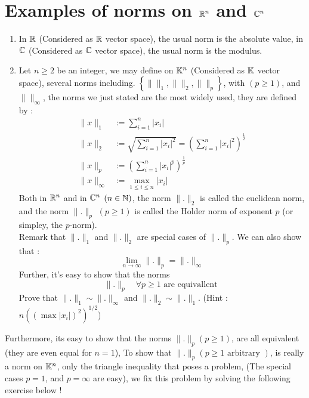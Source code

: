 
% 

\lecday[2025-02-06]

% 
\large


\section{Examples of norms on 
	\texorpdfstring{$\mathbb{R}^n$}{Rn} and 
	\texorpdfstring{$\mathbb{C}^n$}{Cn}}
\begin{example}
	\begin{enumerate}
	\item In $\mathbb{R} $ (Considered as $\mathbb{R} $ vector space), the usual
		norm is the absolute value, in $\mathbb{C} $ (Considered
		as $\mathbb{C} $ vector space), the usual norm is the modulus.
	\item  Let $n \geq 2$ be an integer, we may define 
		on $\mathbb{K}^n$ (Considered as $\mathbb{K}$ vector space), several norms
		including. 
		$\left\{ \|  \| _{1}, \|  \| _{2}, \|  \| _{p} \right\}$, with 
		$\left( p \geq 1 \right)$, and $\|  \| _{\infty }$, the norms
		we just stated are the most widely used, they are defined by : 
		\begin{align*}
			\| x \| _{1} &:= 
			\sum_{i=1}^{n} \left| x_{i} \right|
			\\
			\| x \| _{2} &:=
			\sqrt{ \sum_{i=1}^{n} \left| 
			x_{i}\right|^2  }  = 
			\left( \sum_{i=1}^{n} \left| x_{i} \right|^2  \right)^{
			\frac{1}{2}}
			\\
			\| x \| _{p} &:=
			\left( 
				\sum_{i=1}^{n}  \left| x_{i} \right|^{p}
			\right)^{\frac{1}{p}} \\
			\| x \| _{\infty } &:= 
			\max_{1 \leq i \leq n} \left| x_{i} \right|
		\end{align*}
		Both in $\mathbb{R}^n$  and in $\mathbb{C} ^{n}$  $\left( n \in \mathbb{N} \right)$, 
		the norm $\| .\| _{2}$  is called
		the euclidean norm, and the norm
		$\|  .\| _{p}$  $\left( p \geq 1 \right)$  is called
		the Holder norm of exponent $p$ (or simpley, the $p$-norm).\\
		Remark that $\|.  \| _{1}$  and $\|.  \| _{2}$ are special
		cases of $\|.  \| _{p}$. We can also show that :
		\[
		\lim_{n \to \infty} \| . \| _{p} = 
		\| . \| _{\infty }
		\]
		Further, it's easy to show that the norms 
		\[
		\| . \| _{p} \quad \forall p \geq 1 \text{ are equivallent } 
		\]
		Prove that $\| . \| _{1} \sim \| . \| _{\infty }$ and 
		$\| . \| _{2} \sim \| . \| _{1}$. (Hint : $n 
		\left( 
			( \max \left| x_{i} \right| )^2 
		\right)^{1/2}
	       $)
	\end{enumerate}
	Furthermore, its easy to show
	that the norms
	$\| . \| _{p} \left( p \geq 1 \right)$, 
	are all equivalent (they are even equal 
	for $n=1$), To show that 
	$\| . \| _{p} \left( p \geq 1 \text{ 
	arbitrary } \right)$, is really a norm
	on $\mathbb{K}^n$, only the triangle inequality
	that poses a problem, (The special 
	cases $p=1$, and $p = \infty $ are
	easy), we fix this problem by solving the following 
	exercise below !
\end{example}
